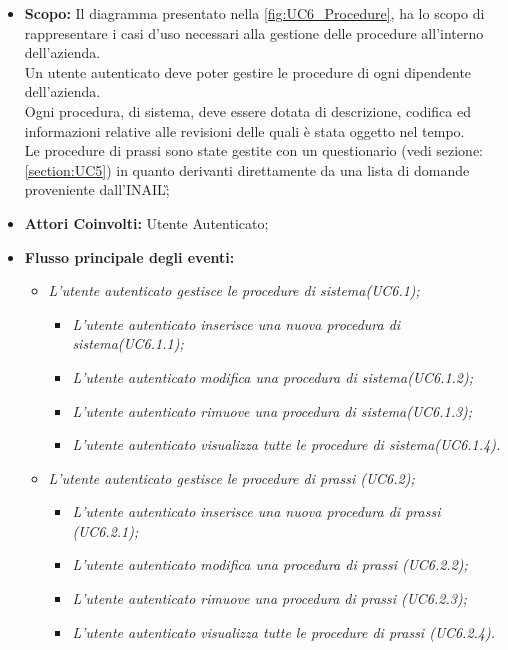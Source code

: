 			\begin{itemize}
				\item \textbf{Scopo:} Il diagramma presentato nella \autoref{fig:UC6_Procedure}, ha lo scopo di rappresentare i casi d'uso necessari alla gestione delle procedure all'interno dell'azienda. \\ 
				
				Un utente autenticato deve poter gestire le procedure di ogni dipendente dell'azienda. \\
				Ogni procedura, di sistema, deve essere dotata di descrizione, codifica ed informazioni relative alle revisioni delle quali è stata oggetto nel tempo.\\
				Le procedure di prassi sono state gestite con un questionario (vedi sezione: \ref{section:UC5}) in quanto derivanti direttamente da una lista di domande proveniente dall'\gls{INAIL}\G;
				\item \textbf{Attori Coinvolti:} Utente Autenticato;
				\item \textbf{Flusso principale degli eventi:} 
				\begin{itemize}
					\item \textit{L'utente autenticato gestisce le procedure di sistema(UC6.1);}
					\begin{itemize}
						\item \textit{L'utente autenticato inserisce una nuova procedura di sistema(UC6.1.1);}
						\item \textit{L'utente autenticato modifica una procedura di sistema(UC6.1.2);}
						\item \textit{L'utente autenticato rimuove una procedura di sistema(UC6.1.3);}
						\item \textit{L'utente autenticato visualizza tutte le procedure di sistema(UC6.1.4).}
					\end{itemize}
					\item \textit{L'utente autenticato gestisce le procedure di prassi (UC6.2);}
					\begin{itemize}
						\item \textit{L'utente autenticato inserisce una nuova procedura di prassi (UC6.2.1);}
						\item \textit{L'utente autenticato modifica una procedura di prassi (UC6.2.2);}
						\item \textit{L'utente autenticato rimuove una procedura di prassi (UC6.2.3);}
						\item \textit{L'utente autenticato visualizza tutte le procedure di prassi (UC6.2.4).}
					\end{itemize}
				\end{itemize}
			\end{itemize}
			
